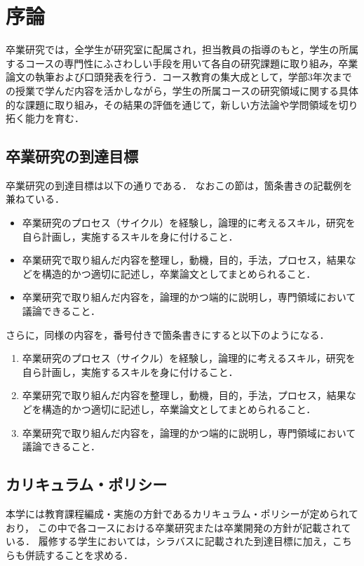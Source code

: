 \chapter{序論}	%
\thispagestyle{plain}   %

卒業研究では，全学生が研究室に配属され，担当教員の指導のもと，学生の所属するコースの専門性にふさわしい手段を用いて各自の研究課題に取り組み，卒業論文の執筆および口頭発表を行う．コース教育の集大成として，学部3年次までの授業で学んだ内容を活かしながら，学生の所属コースの研究領域に関する具体的な課題に取り組み，その結果の評価を通じて，新しい方法論や学問領域を切り拓く能力を育む．

\section{卒業研究の到達目標}
卒業研究の到達目標は以下の通りである．
なおこの節は，箇条書きの記載例を兼ねている．
\begin{itemize}
\item 卒業研究のプロセス（サイクル）を経験し，論理的に考えるスキル，研究を自ら計画し，実施するスキルを身に付けること．
\item 卒業研究で取り組んだ内容を整理し，動機，目的，手法，プロセス，結果などを構造的かつ適切に記述し，卒業論文としてまとめられること．
\item 卒業研究で取り組んだ内容を，論理的かつ端的に説明し，専門領域において議論できること．
\end{itemize}

さらに，同様の内容を，番号付きで箇条書きにすると以下のようになる．
\begin{enumerate}
\item 卒業研究のプロセス（サイクル）を経験し，論理的に考えるスキル，研究を自ら計画し，実施するスキルを身に付けること．
\item 卒業研究で取り組んだ内容を整理し，動機，目的，手法，プロセス，結果などを構造的かつ適切に記述し，卒業論文としてまとめられること．
\item 卒業研究で取り組んだ内容を，論理的かつ端的に説明し，専門領域において議論できること．
\end{enumerate}

\section{カリキュラム・ポリシー}
本学には教育課程編成・実施の方針であるカリキュラム・ポリシーが定められており，
この中で各コースにおける卒業研究または卒業開発の方針が記載されている．
履修する学生においては，シラバスに記載された到達目標に加え，こちらも併読することを求める．

